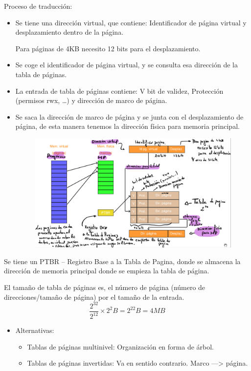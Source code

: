 \documentclass[12pt, twoside, openright]{report} %
\begin{document}
    Proceso de traducción:
    \begin{itemize}

  \item Se tiene una dirección virtual, que contiene: Identificador de
    página virtual y desplazamiento dentro de la página.

    Para páginas de 4KB necesito 12 bits para el desplazamiento.

    
    
    \item
      Se coge el identificador de página virtual, y se consulta esa
      dirección de la tabla de páginas.
    \item
      La entrada de tabla de páginas contiene: V bit de validez,
      Protección (permisos rwx, \ldots) y dirección de marco de página.
  \item
    Se saca la dirección de marco de página y se junta con el
    desplazamiento de página, de esta manera tenemos la dirección física
    para memoria principal.
    \begin{figure}[H]
      {\includegraphics[scale=.35]{Untitled 30.png}}
    \end{figure}
  \end{itemize}
  Se tiene un PTBR -- Registro Base a la Tabla de Pagina, donde se
  almacena la dirección de memoria principal donde se empieza la tabla
  de página.

  El tamaño de tabla de páginas es, el número de página (número de
  direcciones/tamaño de página) por el tamaño de la entrada.
$$\frac{2^{32}}{2^{12}} \times 2^2 B = 2^22 B = 4 MB$$
  \begin{itemize}
    \item Alternativas:
    \begin{itemize}
      \item Tablas de páginas multinivel: Organización en forma de árbol.
      \item Tablas de páginas invertidas: Va en sentido contrario. Marco —> página.
    \end{itemize}
    
  \end{itemize}
\end{document}
